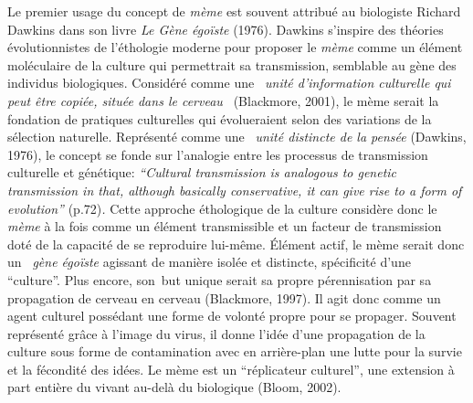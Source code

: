 Le premier usage du concept de \textit{m\`eme} est souvent attribu\'e au
biologiste Richard Dawkins dans son livre \textit{Le G\`ene \'ego\"iste
}(1976). Dawkins s{\textquoteright}inspire des th\'eories
\'evolutionnistes de l{\textquoteright}\'ethologie moderne pour
proposer le \textit{m\`eme} comme un \'el\'ement mol\'eculaire de la
culture qui permettrait sa transmission, semblable au g\`ene des
individus biologiques. Consid\'er\'e comme une
\textit{{\guillemotleft}~unit\'e d{\textquoteright}information
culturelle qui peut \^etre copi\'ee, situ\'ee dans le
cerveau~{\guillemotright}} (Blackmore, 2001), le m\`eme serait la
fondation de pratiques culturelles qui \'evolueraient selon des
variations de la s\'election naturelle. Repr\'esent\'e comme une
{\guillemotleft}~\textit{unit\'e distincte de la pens\'ee
{\guillemotright} }(Dawkins, 1976), le concept se fonde sur
l{\textquoteright}analogie entre les processus de transmission
culturelle et g\'en\'etique: \textit{{\textquotedblleft}Cultural
transmission is analogous to genetic transmission in that, although
basically conservative, it can give rise to a form of
evolution{\textquotedblright} }(p.72)\textit{.} Cette approche
\'ethologique de la culture consid\`ere donc le \textit{m\`eme} \`a la
fois comme un \'el\'ement transmissible et un facteur de transmission
dot\'e de la capacit\'e de se reproduire lui-m\^eme. \'El\'ement actif,
le m\`eme serait donc un \textit{{\guillemotleft}~g\`ene \'ego\"iste
{\guillemotright} }agissant de mani\`ere isol\'ee et distincte,
sp\'ecificit\'e d{\textquoteright}une
{\textquotedblleft}culture{\textquotedblright}. Plus encore, son~but
unique serait sa propre p\'erennisation par sa propagation de cerveau
en cerveau (Blackmore, 1997). Il agit donc comme un agent culturel
poss\'edant une forme de volont\'e propre pour se propager. Souvent
repr\'esent\'e gr\^ace \`a l{\textquoteright}image du virus, il donne
l{\textquoteright}id\'ee d{\textquoteright}une propagation de la
culture sous forme de contamination avec en arri\`ere-plan une lutte
pour la survie et la f\'econdit\'e des id\'ees. Le m\`eme est un
{\textquotedblleft}r\'eplicateur culturel{\textquotedblright}, une
extension \`a part enti\`ere du vivant au-del\`a du biologique (Bloom,
2002).


